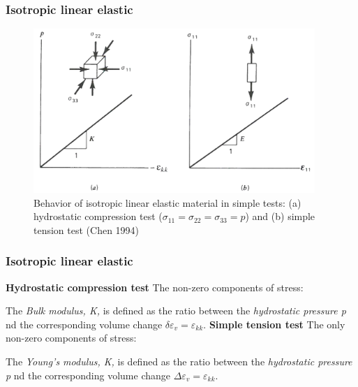 \documentclass[notes]{beamer}
\begin{document}
\begin{frame}
\frametitle{Isotropic linear elastic}
	\begin{figure}
		\includegraphics[width=0.95\textwidth]{figs/isotropic-linear-elastic.png}
		\caption*{Behavior of isotropic linear elastic material in simple tests: (a) hydrostatic compression test ($\sigma_{11} = \sigma_{22} = \sigma_{33} = p$) and (b) simple tension test (Chen 1994)}
	\end{figure}
\end{frame}

\begin{frame}
\frametitle{Isotropic linear elastic}
\textbf{Hydrostatic compression test}
The non-zero components of stress: 

The \textit{Bulk modulus, K,}  is defined as the ratio between the \textit{hydrostatic pressure p} nd the corresponding volume change $\delta \varepsilon_v = \varepsilon_{kk}$. 
\textbf{Simple tension test}
The only non-zero components of stress: 

The \textit{Young's modulus, K,}  is defined as the ratio between the \textit{hydrostatic pressure p} nd the corresponding volume change $\Delta \varepsilon_v = \varepsilon_{kk}$. 
\end{frame}
\end{document}
